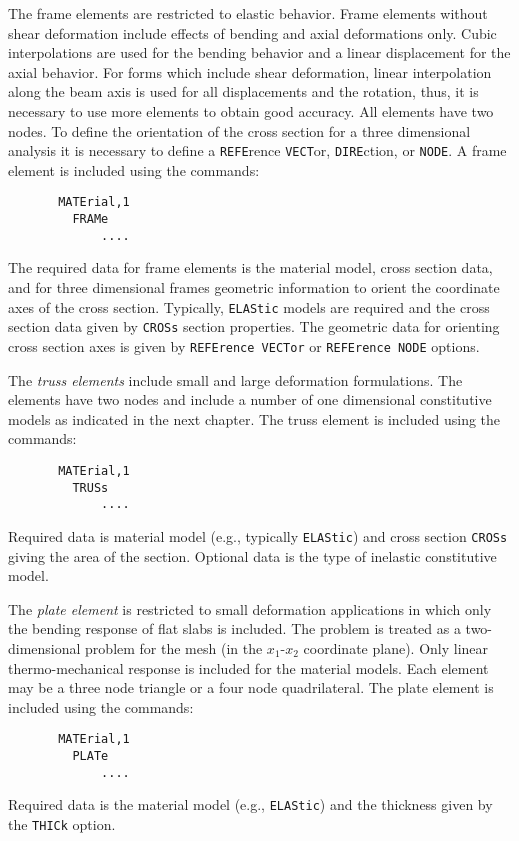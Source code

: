 The frame elements are restricted to elastic behavior.
Frame elements without shear deformation
include effects of bending and axial deformations only.  Cubic interpolations
are used for the bending behavior and a linear displacement for the
axial behavior.
For forms which include shear deformation, linear interpolation along
the beam axis is used
for all displacements and the rotation, thus, it is necessary to use more
elements to obtain good accuracy.  All elements have
two nodes.  To define the orientation of the cross section for a three
dimensional analysis it is necessary to define a \texttt{REFE}r\-ence
\texttt{VECT}or, \texttt{DIRE}c\-tion, or \texttt{NODE}.
A frame element is included using the commands:
\begin{verbatim}
       MATErial,1
         FRAMe
             ....
\end{verbatim}
The required data for frame elements is the material model, cross section
data, and for three dimensional frames geometric information to orient the
coordinate axes of the cross section.  Typically, \texttt{ELAStic} models are
required and the
cross section data given by \texttt{CROSs} section properties.
The geometric data for orienting cross section axes
is given by \texttt{REFErence VECTor} or \texttt{REFErence NODE} options.

The {\it truss elements} include small and large deformation formulations.
The elements have two nodes and include a number of one dimensional
constitutive models as indicated in the next chapter.
The truss element is included using the commands:
\begin{verbatim}
       MATErial,1
         TRUSs
             ....
\end{verbatim}
Required data is material model (e.g., typically \texttt{ELAStic}) and cross
section \texttt{CROSs} giving the area of the section.
Optional data is the type of inelastic constitutive model.

The {\it plate element} is restricted to small deformation applications
in which only the bending response of flat slabs is included.  The problem
is treated as a two-dimensional problem for the mesh (in the $x_1$-$x_2$
coordinate plane).  Only
linear thermo-mechanical response is included for the material models.
Each element may be a three node triangle or a four node quadrilateral.
The plate element is included using the commands:
\begin{verbatim}
       MATErial,1
         PLATe
             ....
\end{verbatim}
Required data is the material model (e.g., \texttt{ELAStic}) and the thickness
given by the \texttt{THICk} option.

